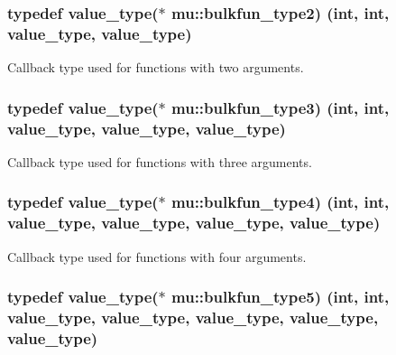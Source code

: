 \subsubsection[{\texorpdfstring{bulkfun\+\_\+type2}{bulkfun_type2}}]{\setlength{\rightskip}{0pt plus 5cm}typedef {\bf value\+\_\+type}($\ast$ mu\+::bulkfun\+\_\+type2) (int, int, {\bf value\+\_\+type}, {\bf value\+\_\+type})}\hypertarget{namespacemu_a9faa755ea34c6e8de3895013e649a713}{}\label{namespacemu_a9faa755ea34c6e8de3895013e649a713}


Callback type used for functions with two arguments. 

\subsubsection[{\texorpdfstring{bulkfun\+\_\+type3}{bulkfun_type3}}]{\setlength{\rightskip}{0pt plus 5cm}typedef {\bf value\+\_\+type}($\ast$ mu\+::bulkfun\+\_\+type3) (int, int, {\bf value\+\_\+type}, {\bf value\+\_\+type}, {\bf value\+\_\+type})}\hypertarget{namespacemu_a441194d09cb0e9331dbfdaf74f59efd3}{}\label{namespacemu_a441194d09cb0e9331dbfdaf74f59efd3}


Callback type used for functions with three arguments. 

\subsubsection[{\texorpdfstring{bulkfun\+\_\+type4}{bulkfun_type4}}]{\setlength{\rightskip}{0pt plus 5cm}typedef {\bf value\+\_\+type}($\ast$ mu\+::bulkfun\+\_\+type4) (int, int, {\bf value\+\_\+type}, {\bf value\+\_\+type}, {\bf value\+\_\+type}, {\bf value\+\_\+type})}\hypertarget{namespacemu_a6b7ce6e1f888b02222d2765d1f521507}{}\label{namespacemu_a6b7ce6e1f888b02222d2765d1f521507}


Callback type used for functions with four arguments. 

\subsubsection[{\texorpdfstring{bulkfun\+\_\+type5}{bulkfun_type5}}]{\setlength{\rightskip}{0pt plus 5cm}typedef {\bf value\+\_\+type}($\ast$ mu\+::bulkfun\+\_\+type5) (int, int, {\bf value\+\_\+type}, {\bf value\+\_\+type}, {\bf value\+\_\+type}, {\bf value\+\_\+type}, {\bf value\+\_\+type})}\hypertarget{namespacemu_a9343ce135e0a53897a67c6098d07a7b3}{}\label{namespacemu_a9343ce135e0a53897a67c6098d07a7b3}


